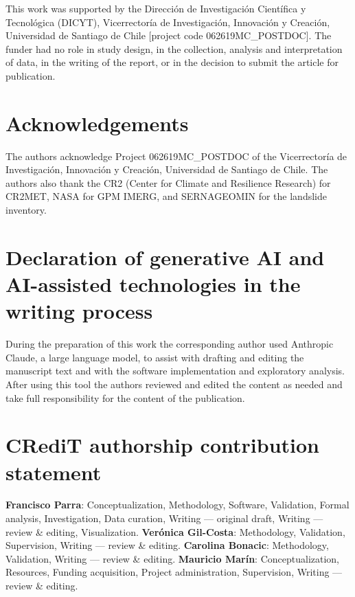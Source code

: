 \documentclass[authoryear,preprint,review,12pt]{elsarticle}
\begin{document}
This work was supported by the Direcci\'on de Investigaci\'on Cient\'ifica y
Tecnol\'ogica (DICYT), Vicerrector\'ia de Investigaci\'on, Innovaci\'on y
Creaci\'on, Universidad de Santiago de Chile [project code
062619MC\_POSTDOC]. The funder had no role in study design, in the collection,
analysis and interpretation of data, in the writing of the report, or in the
decision to submit the article for publication.

\section*{Acknowledgements}

The authors acknowledge Project 062619MC\_POSTDOC of the Vicerrector\'ia de
Investigaci\'on, Innovaci\'on y Creaci\'on, Universidad de Santiago de Chile.
The authors also thank the CR2 (Center for Climate and
Resilience Research) for CR2MET, NASA for GPM IMERG, and SERNAGEOMIN for the
landslide inventory.

\section*{Declaration of generative AI and AI-assisted technologies in the writing process}

During the preparation of this work the corresponding author used Anthropic Claude, a large
language model, to assist with drafting and editing the manuscript text and with
the software implementation and exploratory analysis. After using this tool the
authors reviewed and edited the content as needed and take full responsibility for
the content of the publication.

\section*{CRediT authorship contribution statement}

\textbf{Francisco Parra}: Conceptualization, Methodology, Software, Validation,
Formal analysis, Investigation, Data curation, Writing --- original draft,
Writing --- review \& editing, Visualization.
\textbf{Ver\'onica Gil-Costa}: Methodology, Validation, Supervision,
Writing --- review \& editing.
\textbf{Carolina Bonacic}: Methodology, Validation, Writing --- review \& editing.
\textbf{Mauricio Mar\'in}: Conceptualization, Resources, Funding acquisition,
Project administration, Supervision, Writing --- review \& editing.
\end{document}
